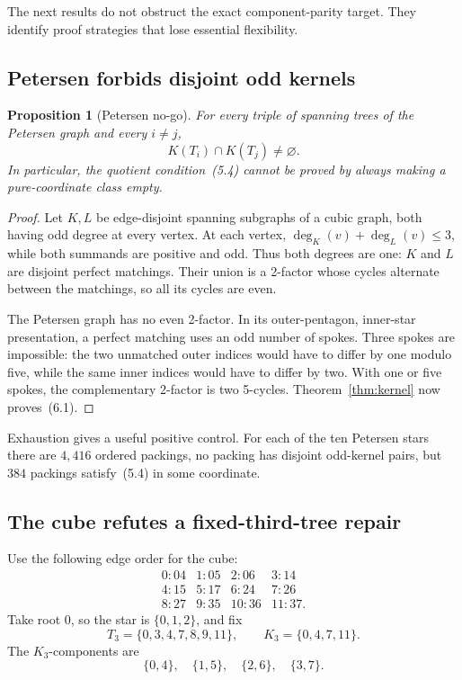 \documentclass[11pt]{article}
\newtheorem{proposition}[theorem]{Proposition}
\theoremstyle{definition}
\theoremstyle{remark}
\newcommand{\1}{\mathbf 1}
\begin{document}
The next results do not obstruct the exact component-parity target.  They
identify proof strategies that lose essential flexibility.

\subsection{Petersen forbids disjoint odd kernels}

\begin{proposition}[Petersen no-go]\label{prop:petersen}
For every triple of spanning trees of the Petersen graph and every
\(i\ne j\),
\[
 K(T_i)\cap K(T_j)\ne\varnothing.                         \tag{6.1}
\]
In particular, the quotient condition~(5.4) cannot be proved by always
making a pure-coordinate class empty.
\end{proposition}

\begin{proof}
Let \(K,L\) be edge-disjoint spanning subgraphs of a cubic graph, both
having odd degree at every vertex.  At each vertex,
\(\deg_K(v)+\deg_L(v)\leq3\), while both summands are positive and odd.
Thus both degrees are one: \(K\) and \(L\) are disjoint perfect matchings.
Their union is a 2-factor whose cycles alternate between the matchings,
so all its cycles are even.

The Petersen graph has no even 2-factor.  In its outer-pentagon,
inner-star presentation, a perfect matching uses an odd number of spokes.
Three spokes are impossible: the two unmatched outer indices would have
to differ by one modulo five, while the same inner indices would have to
differ by two.  With one or five spokes, the complementary 2-factor is
two 5-cycles.  Theorem~\ref{thm:kernel} now proves~(6.1).
\end{proof}

Exhaustion gives a useful positive control.  For each of the ten Petersen
stars there are \(4{,}416\) ordered packings, no packing has disjoint
odd-kernel pairs, but \(384\) packings satisfy~(5.4) in some coordinate.

\subsection{The cube refutes a fixed-third-tree repair}

Use the following edge order for the cube:
\[
\begin{array}{llll}
0:04&1:05&2:06&3:14\\
4:15&5:17&6:24&7:26\\
8:27&9:35&10:36&11:37.
\end{array}
\]
Take root \(0\), so the star is \(\{0,1,2\}\), and fix
\[
 T_3=\{0,3,4,7,8,9,11\},\qquad
 K_3=\{0,4,7,11\}.                                      \tag{6.2}
\]
The \(K_3\)-components are
\[
 \{0,4\},\quad\{1,5\},\quad\{2,6\},\quad\{3,7\}.          \tag{6.3}
\]
\end{document}
